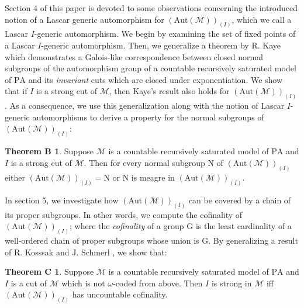 \documentclass[11pt]{article}
\theoremstyle{plain}
\theoremstyle{definition}
\newcommand{\M}{\mathcal{M}}
\newcommand{\G}{\mathrm{G}}
\newcommand{\A}{\mathrm{Aut}}
\newcommand{\pa}{\mathrm{PA}}
\begin{document}
Section 4 of this paper is devoted to some  observations  concerning the introduced  notion of a Lascar generic automorphism for $(\A(\M))_{(I)}$, which we call a Lascar $I$-generic automorphism. We begin by examining the set of fixed points of a Lascar $I$-generic automorphism. Then, we generalize a theorem by R. Kaye \cite{k} which demonstrates a Galois-like correspondence between closed normal subgroups of the automorphism group of a countable recursively saturated model of $\pa$ and its \textit{invariant} cuts which are closed under exponentiation.  We show that if $I$ is a strong cut of $\M $, then  Kaye's result also holds for   $(\A(\M))_{(I)}$. As a consequence, we use this generalization along with the notion of Lascar $I$-generic automorphisms to derive a property for the normal subgroups of $(\A(\M))_{(I)}$:
\newtheorem*{bb}{Theorem B}
\begin{bb}
	Suppose $\M$ is a countable recursively saturated model of $\pa$ and $I$ is a strong cut of $\M$. Then for every  normal subgroup $\mathrm{N}$ of $(\A(\M))_{(I)}$ either $(\A(\M))_{(I)}=\mathrm{N} $ or $\mathrm{N} $ is  meagre in $(\A(\M))_{(I)}$.
	\end{bb}

In section 5, we investigate how $(\A(\M))_{(I)}$ can be covered by a chain of its proper subgroups. In other words, we compute the cofinality of $(\A(\M))_{(I)}$; where
 the \textit{cofinality} of a group $\G$ is the least cardinality of a well-ordered chain of proper subgroups whose union is $\G$. By generalizing a result of R. Kosssak and J. Schmerl \cite{ks}, we show that:
\newtheorem*{cc}{Theorem C}
\begin{cc}
	Suppose $\M$ is a countable recursively saturated model of $\pa$ and $I$ is a  cut of $\M$ which is not $\omega$-coded from above. Then $I$ is strong in $\M$ iff $ (\A(\M))_{(I)}$ has uncountable cofinality.
\end{cc}
\end{document}

